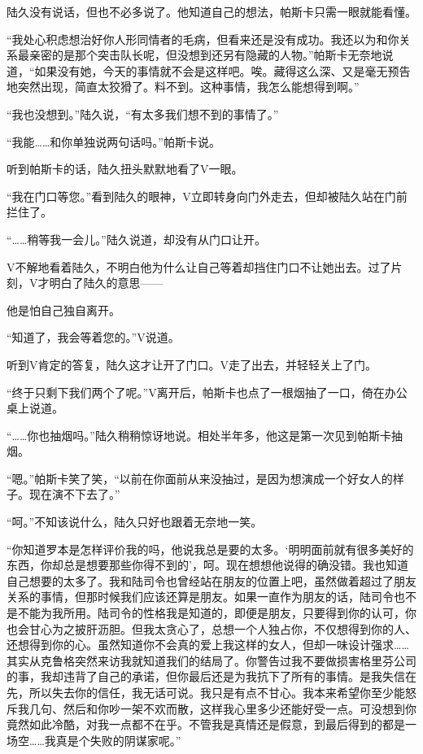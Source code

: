 陆久没有说话，但也不必多说了。他知道自己的想法，帕斯卡只需一眼就能看懂。

“我处心积虑想治好你人形同情者的毛病，但看来还是没有成功。我还以为和你关系最亲密的是那个突击队长呢，但没想到还另有隐藏的人物。”帕斯卡无奈地说道，“如果没有她，今天的事情就不会是这样吧。唉。藏得这么深、又是毫无预告地突然出现，简直太狡猾了。料不到。这种事情，我怎么能想得到啊。”

“我也没想到。”陆久说，“有太多我们想不到的事情了。”

“我能……和你单独说两句话吗。”帕斯卡说。

听到帕斯卡的话，陆久扭头默默地看了V一眼。

“我在门口等您。”看到陆久的眼神，V立即转身向门外走去，但却被陆久站在门前拦住了。

“……稍等我一会儿。”陆久说道，却没有从门口让开。

V不解地看着陆久，不明白他为什么让自己等着却挡住门口不让她出去。过了片刻，V才明白了陆久的意思——

他是怕自己独自离开。

“知道了，我会等着您的。”V说道。

听到V肯定的答复，陆久这才让开了门口。V走了出去，并轻轻关上了门。

“终于只剩下我们两个了呢。”V离开后，帕斯卡也点了一根烟抽了一口，倚在办公桌上说道。

“……你也抽烟吗。”陆久稍稍惊讶地说。相处半年多，他这是第一次见到帕斯卡抽烟。

“嗯。”帕斯卡笑了笑，“以前在你面前从来没抽过，是因为想演成一个好女人的样子。现在演不下去了。”

“呵。”不知该说什么，陆久只好也跟着无奈地一笑。

“你知道罗本是怎样评价我的吗，他说我总是要的太多。‘明明面前就有很多美好的东西，你却总是想要那些你得不到的’，呵。现在想想他说得的确没错。我也知道自己想要的太多了。我和陆司令也曾经站在朋友的位置上吧，虽然做着超过了朋友关系的事情，但那时候我们应该还算是朋友。如果一直作为朋友的话，陆司令也不是不能为我所用。陆司令的性格我是知道的，即便是朋友，只要得到你的认可，你也会甘心为之披肝沥胆。但我太贪心了，总想一个人独占你，不仅想得到你的人、还想得到你的心。虽然知道你不会真的爱上我这样的女人，但却一味设计强求……其实从克鲁格突然来访我就知道我们的结局了。你警告过我不要做损害格里芬公司的事，我却违背了自己的承诺，但你最后还是为我抗下了所有的事情。是我失信在先，所以失去你的信任，我无话可说。我只是有点不甘心。我本来希望你至少能怒斥我几句、然后和你吵一架不欢而散，这样我心里多少还能好受一点。可没想到你竟然如此冷酷，对我一点都不在乎。不管我是真情还是假意，到最后得到的都是一场空……我真是个失败的阴谋家呢。”


